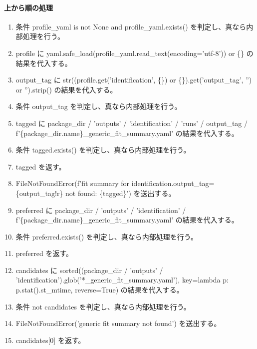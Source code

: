 \documentclass[a4paper,11pt]{article}
\begin{document}
            \paragraph{上から順の処理}
            \begin{enumerate}[leftmargin=1.8em]
            \item 条件 profile\_yaml is not None and profile\_yaml.exists() を判定し、真なら内部処理を行う。
\item   profile に yaml.safe\_load(profile\_yaml.read\_text(encoding='utf-8')) or \{\} の結果を代入する。
\item   output\_tag に str((profile.get('identification', \{\}) or \{\}).get('output\_tag', '') or '').strip() の結果を代入する。
\item   条件 output\_tag を判定し、真なら内部処理を行う。
\item     tagged に package\_dir / 'outputs' / 'identification' / 'runs' / output\_tag / f'\{package\_dir.name\}\_generic\_fit\_summary.yaml' の結果を代入する。
\item     条件 tagged.exists() を判定し、真なら内部処理を行う。
\item       tagged を返す。
\item     FileNotFoundError(f'fit summary for identification.output\_tag=\{output\_tag!r\} not found: \{tagged\}') を送出する。
\item preferred に package\_dir / 'outputs' / 'identification' / f'\{package\_dir.name\}\_generic\_fit\_summary.yaml' の結果を代入する。
\item 条件 preferred.exists() を判定し、真なら内部処理を行う。
\item   preferred を返す。
\item candidates に sorted((package\_dir / 'outputs' / 'identification').glob('*\_generic\_fit\_summary.yaml'), key=lambda p: p.stat().st\_mtime, reverse=True) の結果を代入する。
\item 条件 not candidates を判定し、真なら内部処理を行う。
\item   FileNotFoundError('generic fit summary not found') を送出する。
\item candidates[0] を返す。
            \end{enumerate}
\end{document}
